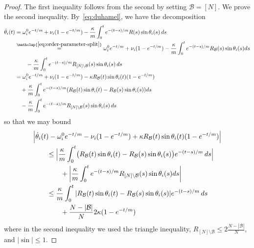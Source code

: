 \documentclass[11pt,reqno]{amsart}
\theoremstyle{definition}
\theoremstyle{remark}
\begin{document}
\begin{proof}
	The first inequality follows from the second by setting $\mathcal{B}=[N]$. We prove the second inequality. By~\eqref{eq:duhamel}, we have the decomposition
\begin{align*}
\dot\theta_i(t)&=\omega_i^0 e^{-t/m}+\nu_i(1-e^{-t/m})-\frac{\kappa}{m}\int_0^t e^{-(t-s)/m}R(s)\sin\theta_i(s)\,ds\\
&\stackrel{\mathclap{\eqref{eq:order-parameter-split}}}{=}\omega_i^0 e^{-t/m}+\nu_i(1-e^{-t/m})-\frac{\kappa}{m}\int_0^t e^{-(t-s)/m}R_\mathcal{B}(s)\sin\theta_i(s)ds\\
&\qquad-\frac{\kappa}{m}\int_0^t e^{-(t-s)/m}R_{[N]\setminus\mathcal{B}}(s)\sin\theta_i(s)\,ds\\
&=\omega_i^0 e^{-t/m}+\nu_i(1-e^{-t/m}) - \kappa R_\mathcal{B}(t)\sin\theta_i(t)(1-e^{-t/m})\\
&\quad +\frac{\kappa}{m}\int_0^t e^{-(t-s)/m}(R_\mathcal{B}(t)\sin\theta_i(t)-R_\mathcal{B}(s)\sin\theta_i(s))ds\\
& \quad -\frac{\kappa}{m}\int_0^t e^{-(t-s)/m}R_{[N]\setminus\mathcal{B}}(s)\sin\theta_i(s)\,ds
\end{align*}
so that we may bound
\begin{align*}
	&\Bigl|\dot\theta_i(t)-\omega_i^0 e^{-t/m}-\nu_i(1-e^{-t/m})+\kappa R_\mathcal{B}(t)\sin\theta_i(t)(1-e^{-t/m})\Bigr|\\
	&\qquad\le \Bigl|\frac{\kappa}{m}\int_0^t\bigl(R_\mathcal{B}(t)\sin\theta_i(t)-R_\mathcal{B}(s)\sin\theta_i(s)\bigr)e^{-(t-s)/m}\,ds\Bigr|\\
	&\qquad\qquad +\left|\frac{\kappa}{m}\int_0^t e^{-(t-s)/m}R_{[N]\setminus\mathcal{B}}(s)\sin\theta_i(s)ds\right|\\
	&\qquad\le\frac{\kappa}{m}\int_0^t|R_\mathcal{B}(t)\sin\theta_i(t)-R_\mathcal{B}(s)\sin\theta_i(s)|e^{-(t-s)/m}\,ds\\
		&\qquad\qquad +\frac{N-|\mathcal{B}|}{N}2\kappa (1-e^{-t/m})
\end{align*}
where in the second inequality we used the triangle inequality, $R_{[N]\setminus\mathcal{B}}\le 2\frac{N-|\mathcal{B}|}{N}$, and $|\sin|\le 1$.



\end{proof}
\end{document}
